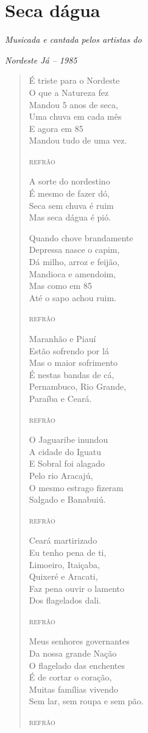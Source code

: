 \chapter{Seca dágua}

\hfill\emph{Musicada e cantada pelos artistas do}

\hfill\emph{Nordeste Já -- 1985}

\begin{verse}
É triste para o Nordeste\\
O que a Natureza fez\\
Mandou 5 anos de seca,\\
Uma chuva em cada mês\\
E agora em 85\\
Mandou tudo de uma vez.

\textsc{refrão}

A sorte do nordestino\\
É mesmo de fazer dó,\\
Seca sem chuva é ruim\\
Mas seca dágua é pió.

Quando chove brandamente\\
Depressa nasce o capim,\\
Dá milho, arroz e feijão,\\
Mandioca e amendoim,\\
Mas como em 85\\
Até o sapo achou ruim.


\textsc{refrão}

Maranhão e Piauí\\
Estão sofrendo por lá\\
Mas o maior sofrimento\\
É nestas bandas de cá,\\
Pernambuco, Rio Grande,\\
Paraíba e Ceará.

\textsc{refrão}

O Jaguaribe inundou\\
A cidade do Iguatu\\
E Sobral foi alagado\\
Pelo rio Aracajú,\\
O mesmo estrago fizeram\\
Salgado e Banabuiú.

\textsc{refrão}

Ceará martirizado\\
Eu tenho pena de ti,\\
Limoeiro, Itaiçaba,\\
Quixeré e Aracati,\\
Faz pena ouvir o lamento\\
Dos flagelados dali.

\textsc{refrão}

Meus senhores governantes\\
Da nossa grande Nação\\
O flagelado das enchentes\\
É de cortar o coração,\\
Muitas famílias vivendo\\
Sem lar, sem roupa e sem pão.

\textsc{refrão}
\end{verse}


